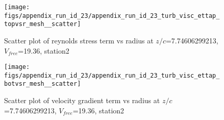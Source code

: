 \begin{figure}[H]
\centering
\texttt{[image: figs/appendix\_run\_id\_23/appendix\_run\_id\_23\_turb\_visc\_ettap\_topvsr\_mesh\_\_scatter]}
\caption{Scatter plot of reynolds stress term vs radius at $z/c$=7.74606299213, $V_{free}$=19.36, station2}
\label{fig:appendix_run_id_23_turb_visc_ettap_topvsr_mesh__scatter}
\end{figure}


\begin{figure}[H]
\centering
\texttt{[image: figs/appendix\_run\_id\_23/appendix\_run\_id\_23\_turb\_visc\_ettap\_botvsr\_mesh\_\_scatter]}
\caption{Scatter plot of velocity gradient term vs radius at $z/c$=7.74606299213, $V_{free}$=19.36, station2}
\label{fig:appendix_run_id_23_turb_visc_ettap_botvsr_mesh__scatter}
\end{figure}


